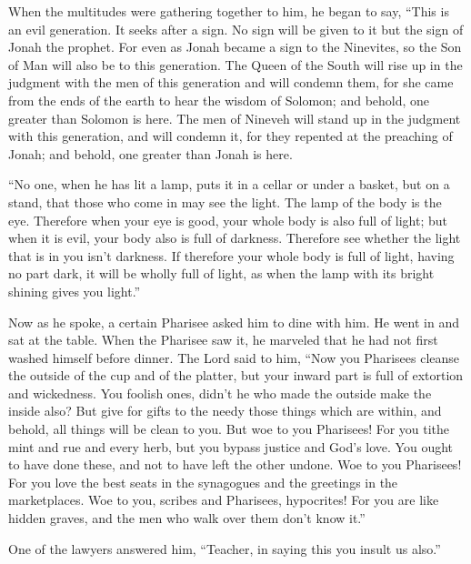  When the multitudes were gathering together to him, he
began to say, ``This is an evil generation. It seeks after a sign. No
sign will be given to it but the sign of Jonah the prophet.
 For even as Jonah became a sign to the Ninevites, so the
Son of Man will also be to this generation.  The Queen of
the South will rise up in the judgment with the men of this generation
and will condemn them, for she came from the ends of the earth to hear
the wisdom of Solomon; and behold, one greater than Solomon is here.
 The men of Nineveh will stand up in the judgment with
this generation, and will condemn it, for they repented at the preaching
of Jonah; and behold, one greater than Jonah is here.

 ``No one, when he has lit a lamp, puts it in a cellar or
under a basket, but on a stand, that those who come in may see the
light.  The lamp of the body is the eye. Therefore when
your eye is good, your whole body is also full of light; but when it is
evil, your body also is full of darkness.  Therefore see
whether the light that is in you isn't darkness.  If
therefore your whole body is full of light, having no part dark, it will
be wholly full of light, as when the lamp with its bright shining gives
you light.''

 Now as he spoke, a certain Pharisee asked him to dine
with him. He went in and sat at the table.  When the
Pharisee saw it, he marveled that he had not first washed himself before
dinner.  The Lord said to him, ``Now you Pharisees
cleanse the outside of the cup and of the platter, but your inward part
is full of extortion and wickedness.  You foolish ones,
didn't he who made the outside make the inside also?  But
give for gifts to the needy those things which are within, and behold,
all things will be clean to you.  But woe to you
Pharisees! For you tithe mint and rue and every herb, but you bypass
justice and God's love. You ought to have done these, and not to have
left the other undone.  Woe to you Pharisees! For you
love the best seats in the synagogues and the greetings in the
marketplaces.  Woe to you, scribes and Pharisees,
hypocrites! For you are like hidden graves, and the men who walk over
them don't know it.''

 One of the lawyers answered him, ``Teacher, in saying
this you insult us also.''

